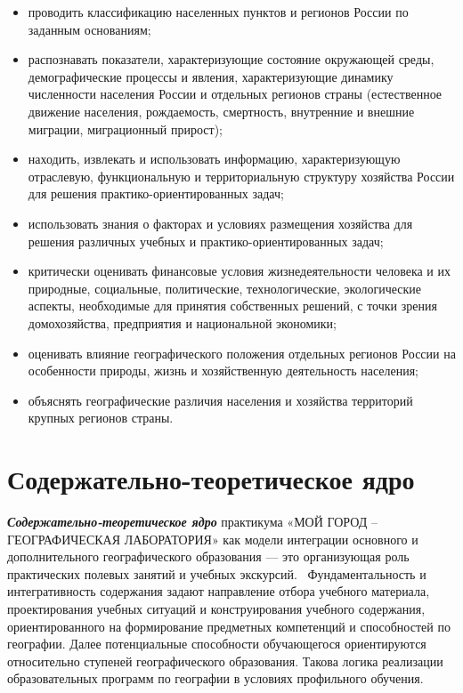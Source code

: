 \documentclass[
  11pt,
  russian,
]{book}
\begin{document}
\begin{itemize}
  отдельных территорий, об особенностях взаимодействия природы и
  общества в пределах отдельных территорий для решения
  практико-ориентированных задач в контексте реальной жизни;
\item
  проводить классификацию населенных пунктов и регионов России по
  заданным основаниям;
\item
  распознавать показатели, характеризующие состояние окружающей среды,
  демографические процессы и явления, характеризующие динамику
  численности населения России и отдельных регионов страны (естественное
  движение населения, рождаемость, смертность, внутренние и внешние
  миграции, миграционный прирост);
\item
  находить, извлекать и использовать информацию, характеризующую
  отраслевую, функциональную и территориальную структуру хозяйства
  России для решения практико-ориентированных задач;
\item
  использовать знания о факторах и условиях размещения хозяйства для
  решения различных учебных и практико-ориентированных задач;
\item
  критически оценивать финансовые условия жизнедеятельности человека и
  их природные, социальные, политические, технологические, экологические
  аспекты, необходимые для принятия собственных решений, с точки зрения
  домохозяйства, предприятия и национальной экономики;
\item
  оценивать влияние географического положения отдельных регионов России
  на особенности природы, жизнь и хозяйственную деятельность населения;
\item
  объяснять географические различия населения и хозяйства территорий
  крупных регионов страны.
\end{itemize}

\hypertarget{ux441ux43eux434ux435ux440ux436ux430ux442ux435ux43bux44cux43dux43e-ux442ux435ux43eux440ux435ux442ux438ux447ux435ux441ux43aux43eux435-ux44fux434ux440ux43e}{%
\section*{Содержательно-теоретическое
ядро}\label{ux441ux43eux434ux435ux440ux436ux430ux442ux435ux43bux44cux43dux43e-ux442ux435ux43eux440ux435ux442ux438ux447ux435ux441ux43aux43eux435-ux44fux434ux440ux43e}}

\textbf{\emph{Содержательно-теоретическое ядро}} практикума «МОЙ ГОРОД
-- ГЕОГРАФИЧЕСКАЯ ЛАБОРАТОРИЯ» как модели интеграции основного и
дополнительного географического образования --- это организующая роль
практических полевых занятий и учебных экскурсий.~ Фундаментальность и
интегративность содержания задают направление отбора учебного материала,
проектирования учебных ситуаций и конструирования учебного содержания,
ориентированного на формирование предметных компетенций и способностей
по географии. Далее потенциальные способности обучающегося ориентируются
относительно ступеней географического образования. Такова логика
реализации образовательных программ по географии в условиях профильного
обучения.
\end{document}
